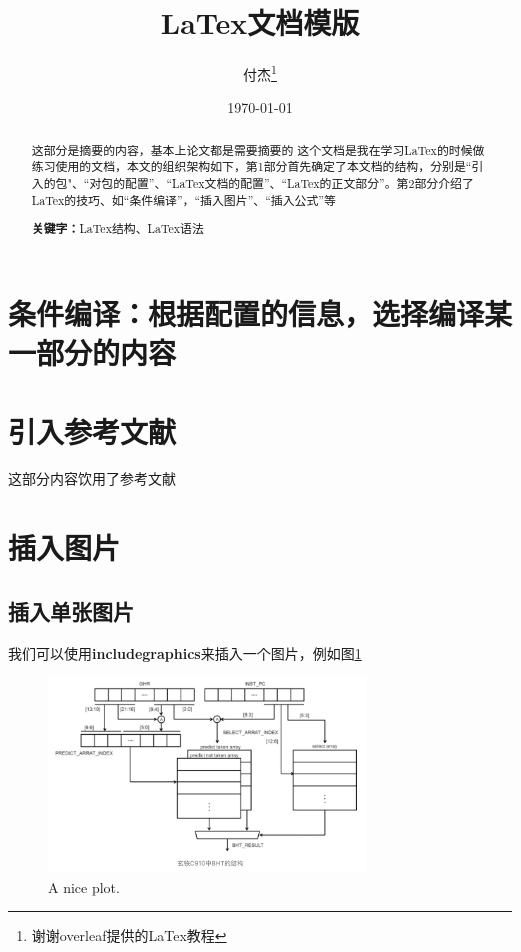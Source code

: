 \documentclass{article}
\title{LaTex文档模版}
\author{付杰\thanks{谢谢overleaf提供的LaTex教程}}
\date{\today}
\newif\ifchinese %
\begin{document}
\maketitle
\newpage

\tableofcontents %
\newpage

\begin{abstract} %
  这部分是摘要的内容，基本上论文都是需要摘要的 这个文档是我在学习LaTex的时候做练习使用的文档，本文的组织架构如下，第1部分首先确定了本文档的结构，分别是“引入的包"、“对包的配置”、“LaTex文档的配置”、“LaTex的正文部分”。第2部分介绍了LaTex的技巧、如“条件编译”，“插入图片”、“插入公式”等
  \par\textbf{关键字：}LaTex结构、LaTex语法
\end{abstract}
\newpage



\section{条件编译：根据配置的信息，选择编译某一部分的内容}

\ifchinese
这部分是条件编译的内容，必须在\textbf{chinesetrue}判定为真的时候，才会被输出
\fi


\section{引入参考文献}
这部分内容饮用了参考文献\cite{ar1}


\section{插入图片}
\subsection{插入单张图片}
我们可以使用\textbf{includegraphics}来插入一个图片，例如图\ref{fig:mesh1} %


\begin{figure}[ht] %
    \centering %
    \includegraphics[width=0.75\textwidth]{C910BHT.jpg} %
    \caption{A nice plot.} %
    \label{fig:mesh1} %
\end{figure}
\end{document}
